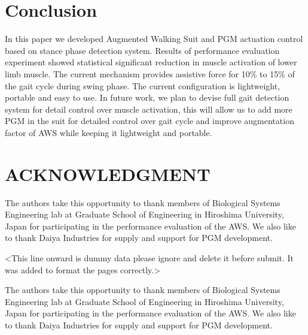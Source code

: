 \documentclass[letterpaper, 10 pt, conference]{ieeeconf}  %
\begin{document}
\section{Conclusion} \label{conclusion}

In this paper we developed Augmented Walking Suit and PGM actuation control based on stance phase detection system. Results of performance evaluation experiment showed statistical significant reduction in muscle activation of lower limb muscle. The current mechanism provides assistive force for 10\% to 15\% of the gait cycle during swing phase. The current configuration is lightweight, portable and easy to use. In future work, we plan to devise full gait detection system for detail control over muscle activation, this will allow us to add more PGM in the suit for detailed control over gait cycle and improve augmentation factor of AWS while keeping it lightweight and portable.









\section*{ACKNOWLEDGMENT}

The authors take this opportunity to thank members of Biological Systems Engineering lab at Graduate School of Engineering in Hiroshima University, Japan for participating in the performance evaluation of the AWS. We also like to thank Daiya Industries for supply and support for PGM development.  

<This line onward is dummy data please ignore and delete it before submit. It was added to format the pages correctly.>

The authors take this opportunity to thank members of Biological Systems Engineering lab at Graduate School of Engineering in Hiroshima University, Japan for participating in the performance evaluation of the AWS. We also like to thank Daiya Industries for supply and support for PGM development. 
\end{document}
